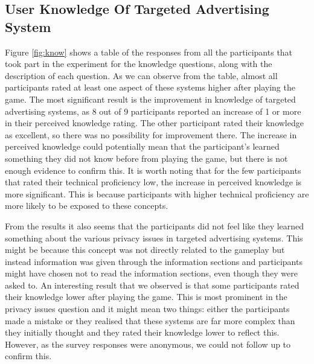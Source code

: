\documentclass{l4proj}
\begin{document}
\subsection{User Knowledge Of Targeted Advertising System}
Figure \ref{fig:know} shows a table of the responses from all the participants that took part in the experiment for the knowledge questions, along with the description of each question. As we can observe from the table, almost all participants rated at least one aspect of these systems higher after playing the game. The most significant result is the improvement in knowledge of targeted advertising systems, as 8 out of 9 participants reported an increase of 1 or more in their perceived knowledge rating. The other participant rated their knowledge as excellent, so there was no possibility for improvement there.
The increase in perceived knowledge could potentially mean that the participant's learned something they did not know before from playing the game, but there is not enough evidence to confirm this. It is worth noting that for the few participants that rated their technical proficiency low, the increase in perceived knowledge is more significant. This is because participants with higher technical proficiency are more likely to be exposed to these concepts. 

From the results it also seems that the participants did not feel like they learned something about the various privacy issues in targeted advertising systems. This might be because this concept was not directly related to the gameplay but instead information was given through the information sections and participants might have chosen not to read the information sections, even though they were asked to. An interesting result that we observed is that some participants rated their knowledge lower after playing the game. This is most prominent in the privacy issues question and it might mean two things: either the participants made a mistake or they realised that these systems are far more complex than they initially thought and they rated their knowledge lower to reflect this. However, as the survey responses were anonymous, we could not follow up to confirm this.
\end{document}
